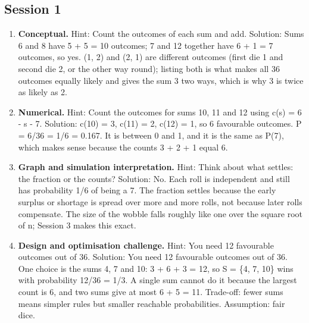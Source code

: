 \documentclass[11pt,a4paper]{article}
\begin{document}
\subsection*{Session 1}
\begin{enumerate}[nosep]
\item \textbf{Conceptual.} Hint: Count the outcomes of each sum and add. Solution: Sums 6 and 8 have 5 + 5 = 10 outcomes; 7 and 12 together have 6 + 1 = 7 outcomes, so yes. (1, 2) and (2, 1) are different outcomes (first die 1 and second die 2, or the other way round); listing both is what makes all 36 outcomes equally likely and gives the sum 3 two ways, which is why 3 is twice as likely as 2.
\item \textbf{Numerical.} Hint: Count the outcomes for sums 10, 11 and 12 using c(s) = 6 - \textbar{}s - 7\textbar{}. Solution: c(10) = 3, c(11) = 2, c(12) = 1, so 6 favourable outcomes. P = 6/36 = 1/6 = 0.167. It is between 0 and 1, and it is the same as P(7), which makes sense because the counts 3 + 2 + 1 equal 6.
\item \textbf{Graph and simulation interpretation.} Hint: Think about what settles: the fraction or the counts? Solution: No. Each roll is independent and still has probability 1/6 of being a 7. The fraction settles because the early surplus or shortage is spread over more and more rolls, not because later rolls compensate. The size of the wobble falls roughly like one over the square root of n; Session 3 makes this exact.
\item \textbf{Design and optimisation challenge.} Hint: You need 12 favourable outcomes out of 36. Solution: You need 12 favourable outcomes out of 36. One choice is the sums 4, 7 and 10: 3 + 6 + 3 = 12, so S = \{4, 7, 10\} wins with probability 12/36 = 1/3. A single sum cannot do it because the largest count is 6, and two sums give at most 6 + 5 = 11. Trade-off: fewer sums means simpler rules but smaller reachable probabilities. Assumption: fair dice.
\end{enumerate}
\end{document}
